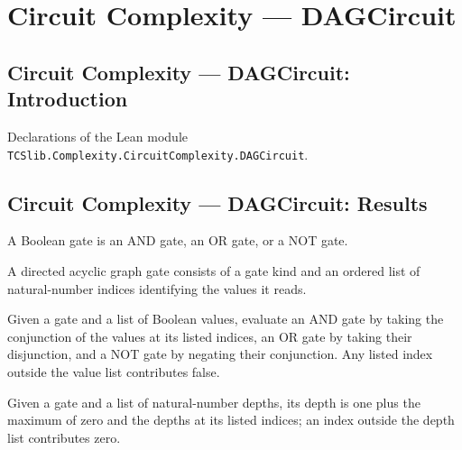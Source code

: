 \section{Circuit Complexity --- DAGCircuit}
\subsection*{Circuit Complexity --- DAGCircuit: Introduction}

Declarations of the Lean module \texttt{TCSlib.Complexity.CircuitComplexity.DAGCircuit}.

\subsection*{Circuit Complexity --- DAGCircuit: Results}

\begin{definition}
\label{BoolCircuit.GateKind}
\leanok
A Boolean gate is an AND gate, an OR gate, or a NOT gate.
\end{definition}

\begin{definition}
\label{BoolCircuit.DAGGate}
\leanok
{}
A directed acyclic graph gate consists of a gate kind and an ordered list of
natural-number indices identifying the values it reads.
\end{definition}

\begin{definition}
\label{BoolCircuit.DAGGate.eval}
\leanok
{}
Given a gate and a list of Boolean values, evaluate an AND gate by taking the
conjunction of the values at its listed indices, an OR gate by taking their disjunction,
and a NOT gate by negating their conjunction. Any listed index outside the value list
contributes false.
\end{definition}

\begin{definition}
\label{BoolCircuit.DAGGate.depth}
\leanok
{}
Given a gate and a list of natural-number depths, its depth is one plus the maximum of
zero and the depths at its listed indices; an index outside the depth list contributes
zero.
\end{definition}

